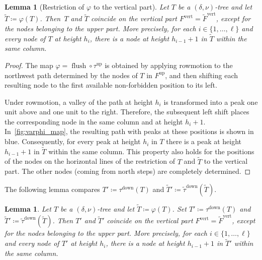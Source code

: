 \documentclass[11pt]{amsart}
\newcounter{valley}
\newcounter{height}
\newcommand{\up}{^{\operatorname{up}}}
\newcommand{\down}{^{\operatorname{down}}}
\newcommand{\ver}{^{\operatorname{vert}}}
\DeclareMathOperator{\flush}{flush}
\newtheorem{lemma}[theorem]{Lemma}
\theoremstyle{definition}
\begin{document}
\begin{lemma}[Restriction of $\varphi$ to the vertical part] \label{lem:varphi_map} 
Let $T$ be a $(\delta,\nu)$-tree and let $\widetilde T \coloneqq \varphi(T)$. Then~$T$ and $\widetilde T$ coincide on the vertical part $F\ver=\widetilde F\ver$, except for the nodes belonging to the upper part. More precisely, for each $i\in\{1,\dots,\ell\}$ and every node of $T$ at height $h_i$, there is a node at height $h_{i-1}+1$ in $\widetilde T$ within the same column.
\end{lemma}

\begin{proof}
The map $\varphi=\flush \circ \tau\up$ is obtained by applying rowmotion to the northwest path determined by the nodes of $T$ in $F\up$, and then shifting each resulting node to the first available non-forbidden position to its left.

Under rowmotion, a valley of the path at height $h_i$ is transformed into a peak one unit above and one unit to the right. Therefore, the subsequent left shift places the corresponding node in the same column and at height $h_{i}+1$. In~\cref{fig:varphi_map}, the resulting path with peaks at these positions is shown in blue. Consequently, for every peak at height $h_i$ in $T$ there is a peak at height $h_{i-1}+1$ in $\widetilde T$ within the same column. This property also holds for the positions of the nodes on the horizontal lines of the restriction of $T$ and $\widetilde T$ to the vertical part. The other nodes (coming from north steps) are completely determined.  
\end{proof}

The following lemma compares $T'\coloneqq \tau\down(T)$ and $\widetilde T' \coloneqq \widetilde{\tau}\down(\widetilde T)$.

\begin{lemma} \label{lem:taudown_varphi}
Let $T$ be a $(\delta,\nu)$-tree and let $\widetilde T\coloneqq \varphi(T)$. Set $T'\coloneqq \tau\down(T)$ and $ \widetilde T' \coloneqq \widetilde{\tau}\down(\widetilde T)$. Then $T'$ and $\widetilde T'$ coincide on the vertical part $F\ver =\widetilde F\ver$, except for the nodes belonging to the upper part. More precisely, for each $i\in\{1,\dots,\ell\}$ and every node of $T'$ at height $h_i$, there is a node at height $h_{i-1}+1$ in $\widetilde T'$ within the same column.
\end{lemma}
\end{document}
